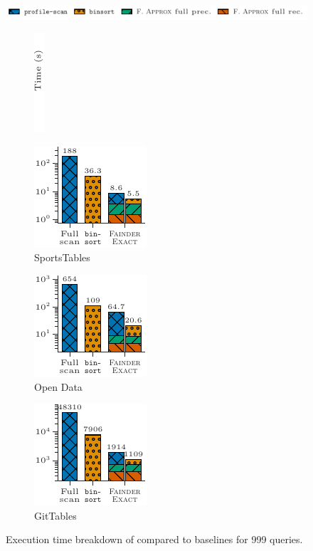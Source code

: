 \begin{figure}[t]
    \centering
    \includegraphics{figures/figure_14_legend.pdf}\\
    \begin{subfigure}[t]{.03\linewidth}
        \centering
        \includegraphics{figures/figure_14_label.pdf}
    \end{subfigure}%
    \hspace{-0.005\linewidth}%
    \begin{subfigure}[t]{.325\linewidth}
        \centering
        \includegraphics{figures/figure_14_a.pdf}
        \caption{SportsTables}
    \end{subfigure}%
    \begin{subfigure}[t]{.325\linewidth}
        \centering
        \includegraphics{figures/figure_14_b.pdf}
        \caption{Open Data}
    \end{subfigure}%
    \begin{subfigure}[t]{.325\linewidth}
        \centering
        \includegraphics{figures/figure_14_c.pdf}
        \caption{GitTables}
    \end{subfigure}%
    \caption{Execution time breakdown of \exact{} compared to baselines for 999 queries.}
    \label{fig:exact_results}
\end{figure}

